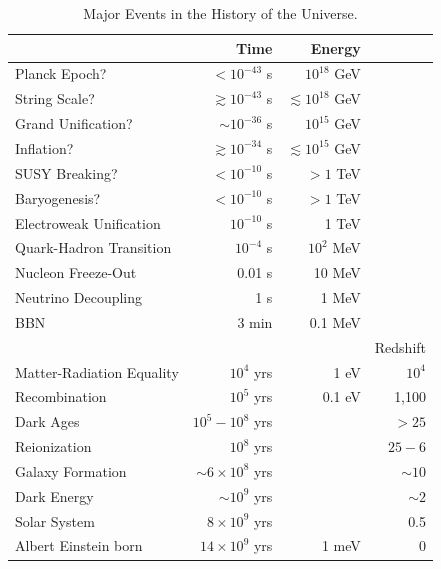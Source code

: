 \documentclass[12pt,letterpaper,rotate]{article}
\begin{document}
{\begin{table}[h!]
\caption{Major Events in the History of the Universe.}
\label{tab:timeline}
\begin{center}
\begin{tabular}{l | r | r | r}
 & {\small Time} & {\small Energy} & \\
 \hline 
 \hline
 {\small Planck Epoch?} & {\small $< 10^{-43}$ s} & {\small $10^{18}$ GeV} &\\
 {\small String Scale?} & {\small $\gtrsim 10^{-43}$ s} & {\small $\lesssim 10^{18}$ GeV} & \\
{\small Grand Unification?} & {\small $\sim 10^{-36}$ s} & {\small $10^{15}$ GeV} & \\
{\small Inflation?} & {\small $\gtrsim 10^{-34}$ s} & {\small $\lesssim 10^{15}$ GeV} &\\
{\small SUSY Breaking?} & {\small $< 10^{-10}$ s} & {\small $> 1$ TeV} &\\
{\small Baryogenesis?} & {\small $< 10^{-10}$ s} & {\small $> 1$ TeV} &\\
\hline
\hline
{\small Electroweak Unification} & {\small $10^{-10}$ s} & {\small 1 TeV} &\\
{\small Quark-Hadron Transition} & {\small $10^{-4}$ s} & {\small $10^2$ MeV} &\\
{\small Nucleon Freeze-Out} & {\small 0.01 s} & {\small 10 MeV} &\\
{\small Neutrino Decoupling} & {\small 1 s} & {\small 1 MeV} &\\
{\small BBN} & {\small 3 min} & {\small 0.1 MeV} &\\
\hline 
\hline
& & & {\small Redshift} \\
\hline 
\hline
{\small Matter-Radiation Equality} & {\small $10^4$ yrs} & {\small 1 eV} & {\small $10^4$}\\
{\small Recombination} & {\small $10^5$ yrs} & {\small 0.1 eV} & {\small 1,100}\\
{\small Dark Ages} & {\small $10^5 - 10^8$ yrs} & & {\small $> 25$} \\
{\small Reionization} & {\small $10^8$ yrs} & & {\small $25 - 6$}\\
{\small Galaxy Formation} & {\small $\sim 6 \times 10^8$ yrs} & & {\small $\sim 10$} \\
{\small Dark Energy} & {\small $\sim 10^9$ yrs} & & {\small $\sim 2$} \\
{\small Solar System} & {\small $8 \times 10^9$ yrs} & & {\small 0.5} \\
{\small Albert Einstein born} & {\small $14 \times 10^{9}$ yrs} & {\small 1 meV} & {\small 0} \\
\hline
\end{tabular}
  \end{center}
\end{table}

}
\end{document}
